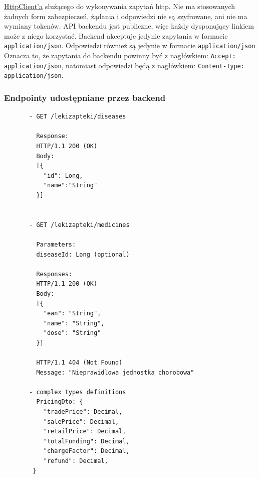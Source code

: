 \documentclass{article}
\begin{document}
    \href{https://angular.io/guide/http}{HttpClient'a} służącego do wykonywania zapytań http.
    Nie ma stosowanych żadnych form zabezpieczeń, żądania i odpowiedzi nie są szyfrowane, ani nie ma wymiany tokenów.
    API backendu jest publiczne, więc każdy dysponujący linkiem może z niego korzystać.
    Backend akceptuje jedynie zapytania w formacie \texttt{application/json}.
    Odpowiedzi również są jedynie w formacie \texttt{application/json}
    Oznacza to, że zapytania do backendu powinny być z nagłówkiem: \texttt{Accept: application/json},
    natomiast odpowiedzi będą z nagłówkiem: \texttt{Content-Type: application/json}.

    \subsubsection{Endpointy udostępniane przez backend}
    \noindent
    \begin{minipage}{.45\textwidth}
     \begin{lstlisting}
       - GET /lekizapteki/diseases

         Response:
         HTTP/1.1 200 (OK)
         Body:
         [{
           "id": Long,
           "name":"String"
         }]


       - GET /lekizapteki/medicines

         Parameters:
         diseaseId: Long (optional)

         Responses:
         HTTP/1.1 200 (OK)
         Body:
         [{
           "ean": "String",
           "name": "String",
           "dose": "String"
         }]

         HTTP/1.1 404 (Not Found)
         Message: "Nieprawidlowa jednostka chorobowa"

       - complex types definitions
         PricingDto: {
           "tradePrice": Decimal,
           "salePrice": Decimal,
           "retailPrice": Decimal,
           "totalFunding": Decimal,
           "chargeFactor": Decimal,
           "refund": Decimal,
        }

     \end{lstlisting}
    \end{minipage}\hfill
\end{document}
